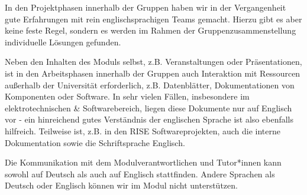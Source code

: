 In den Projektphasen innerhalb der Gruppen haben wir in der Vergangenheit gute Erfahrungen mit rein englischsprachigen Teams gemacht. Hierzu gibt es aber keine feste Regel, sondern es werden im Rahmen der Gruppenzusammenstellung individuelle Lösungen gefunden. 

Neben den Inhalten des Moduls selbst, z.B. Veranstaltungen oder Präsentationen, ist in den Arbeitsphasen innerhalb der Gruppen auch Interaktion mit Ressourcen außerhalb der Universität erforderlich, z.B. Datenblätter, Dokumentationen von Komponenten oder Software. In sehr vielen Fällen, insbesondere im elektrotechnischen \& Softwarebereich, liegen diese Dokumente nur auf Englisch vor - ein hinreichend gutes Verständnis der englischen Sprache ist also ebenfalls hilfreich. Teilweise ist, z.B. in den RISE Softwareprojekten, auch die interne Dokumentation sowie die Schriftsprache Englisch.  

Die Kommunikation mit dem Modulverantwortlichen und Tutor*innen kann sowohl auf Deutsch als auch auf Englisch stattfinden. Andere Sprachen als Deutsch oder Englisch können wir im Modul nicht unterstützen. 
\newpage